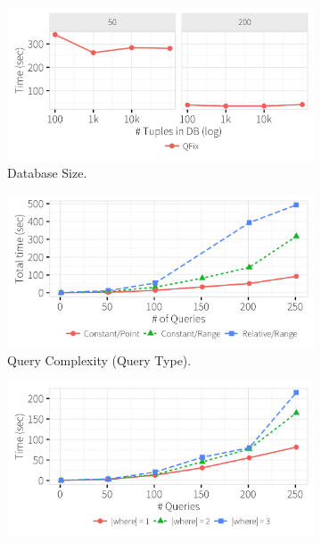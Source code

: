   \begin{figure}[h]
    \centering
    \begin{subfigure}[t]{.3\textwidth}
      \includegraphics[width = .99\columnwidth]{figures/dbsize_time}
      \vspace*{-.1in}
      \caption{Database Size.}
      \label{f:dbsize_time} 
    \end{subfigure}
        \begin{subfigure}[t]{.3\textwidth}
      \includegraphics[width = .99\columnwidth]{figures/pointrelv_time}
      \vspace*{-.1in}
      \caption{Query Complexity (Query Type).}
      \label{f:qidx_time} 
    \end{subfigure}
    \begin{subfigure}[t]{.3\textwidth}
      \includegraphics[width = .99\columnwidth]{figures/where_time}

\end{subfigure}
\end{figure}
